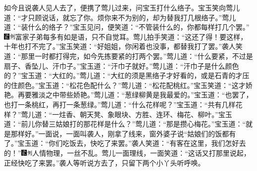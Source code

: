 如今且说袭人见人去了，便携了莺儿过来，问宝玉打什么络子。宝玉笑向莺儿道：“才只顾说话，就忘了你。烦你来不为别的，却为替我打几根络子。”莺儿道：“装什么的络子？”宝玉见问，便笑道：“不管装什么的，你都每样打几个罢。”{\includegraphics[width=3mm]{../Images/00006}\includegraphics[width=3mm]{../Images/00011}\footnotesize \kaishu 富家子弟每多有如是语，只不自觉耳。}莺儿拍手笑道：“这还了得！要这样，十年也打不完了。”宝玉笑道：“好姐姐，你闲着也没事，都替我打了罢。”袭人笑道：“那里一时都打得完，如今先拣要紧的打两个罢。”莺儿道：“什么要紧，不过是扇子、香坠儿、汗巾子。”宝玉道：“汗巾子就好。”莺儿道：“汗巾子是什么颜色的？”宝玉道：“大红的。”莺儿道：“大红的须是黑络子才好看的，或是石青的才压的住颜色。”宝玉道：“松花色配什么？”莺儿道：“松花配桃红。”宝玉笑道：“这才娇艳。再要雅淡之中带些娇艳。”莺儿道：“葱绿柳黄是我最爱的。”宝玉道：“也罢了，也打一条桃红，再打一条葱绿。”莺儿道：“什么花样呢？”宝玉道：“共有几样花样？”莺儿道：“一炷香、朝天凳、象眼块、方胜、连环、梅花、柳叶。”宝玉道：“前儿你替三姑娘打的那花样是什么？”莺儿道：“那是攒心梅花。”宝玉道：“就是那样好。”一面说，一面叫袭人，刚拿了线来，窗外婆子说“姑娘们的饭都有了。”宝玉道：“你们吃饭去，快吃了来罢。”袭人笑道：“有客在这里，我们怎好去的！”{\includegraphics[width=3mm]{../Images/00006}\includegraphics[width=3mm]{../Images/00011}\footnotesize \kaishu 人情物理，一丝不乱。}莺儿一面理线，一面笑道：“这话又打那里说起，正经快吃了来罢。”袭人等听说方去了，只留下两个小丫头听呼唤。

